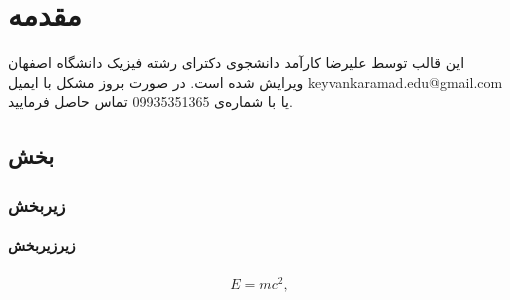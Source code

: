 \chapter{مقدمه}
 این قالب توسط علیرضا کارآمد دانشجوی دکترای رشته فیزیک دانشگاه اصفهان ویرایش شده است. در صورت بروز مشکل با ایمیل 
 keyvankaramad.edu@gmail.com
 یا با شماره‌ی 09935351365 تماس حاصل فرمایید. 
\section{بخش}
\subsection{زیربخش}
\subsubsection{زیرزیربخش}

\begin{equation}
\begin{aligned}
E = mc^2,
\end{aligned}
\end{equation}


